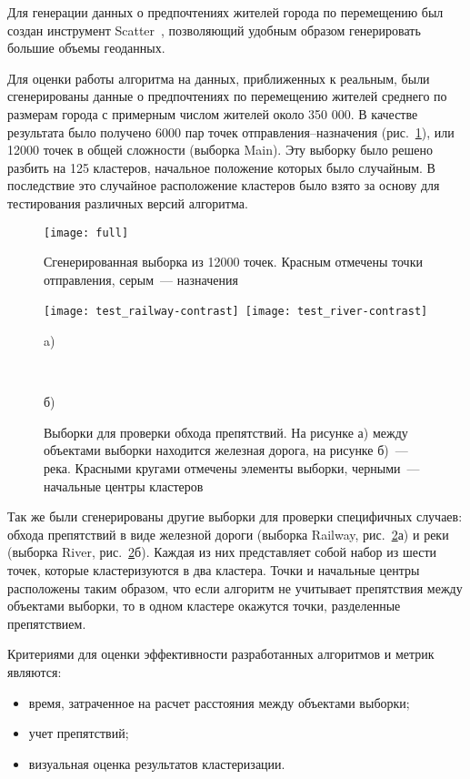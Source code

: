 Для генерации данных о предпочтениях жителей города по перемещению был создан инструмент Scatter~\cite{scatter}, позволяющий удобным образом генерировать большие объемы геоданных.

Для оценки работы алгоритма на данных, приближенных к реальным, были сгенерированы данные о предпочтениях по перемещению жителей среднего по размерам города с примерным числом жителей около 350 000. В качестве результата было получено 6000 пар точек отправления--назначения (рис.~\ref{pic:full}), или 12000 точек в общей сложности (выборка Main). Эту выборку было решено разбить на 125 кластеров, начальное положение которых было случайным. В последствие это случайное расположение кластеров было взято за основу для тестирования различных версий алгоритма.

\begin{figure}[ht!]
    \centering
    \texttt{[image: full]} \\[1ex]
    \parbox{.9\textwidth}{\caption{Сгенерированная выборка из 12000 точек. Красным отмечены точки отправления, серым~--- назначения} \label{pic:full}}
    \vspace*{-1ex}
\end{figure}

\begin{figure}[b!]
    \centering
    \texttt{[image: test\_railway-contrast]}\
    \texttt{[image: test\_river-contrast]} \\
    \parbox{.47\textwidth}{\small\centering a)}\ \parbox{.47\textwidth}{\small\centering б)}
    \parbox{.9\textwidth}{\caption{Выборки для проверки обхода препятствий. На рисунке а) между объектами выборки находится железная дорога, на рисунке б)~--- река. Красными кругами отмечены элементы выборки, черными~--- начальные центры кластеров} \label{pic:railway-river}}
    \vspace*{-1ex}
\end{figure}

Так же были сгенерированы другие выборки для проверки специфичных случаев: обхода препятствий в виде железной дороги (выборка Railway, рис.~\ref{pic:railway-river}а) и реки (выборка River, рис.~\ref{pic:railway-river}б). Каждая из них представляет собой набор из шести точек, которые кластеризуются в два кластера. Точки и начальные центры расположены таким образом, что если алгоритм не учитывает препятствия между объектами выборки, то в одном кластере окажутся точки, разделенные препятствием.

Критериями для оценки эффективности разработанных алгоритмов и метрик являются:
\begin{itemize}
    \item время, затраченное на расчет расстояния между объектами выборки;
    \item учет препятствий;
    \item визуальная оценка результатов кластеризации.
\end{itemize}
